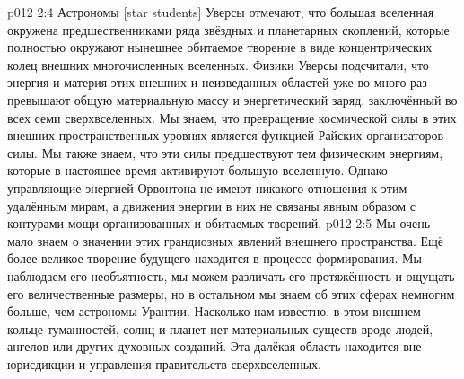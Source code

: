 \vs p012 2:4 \pc Астрономы [star students] Уверсы отмечают, что большая вселенная окружена предшественниками ряда звёздных и планетарных скоплений, которые полностью окружают нынешнее обитаемое творение в виде концентрических колец внешних многочисленных вселенных. Физики Уверсы подсчитали, что энергия и материя этих внешних и неизведанных областей уже во много раз превышают общую материальную массу и энергетический заряд, заключённый во всех семи сверхвселенных. Мы знаем, что превращение космической силы в этих внешних пространственных уровнях является функцией Райских организаторов силы. Мы также знаем, что эти силы предшествуют тем физическим энергиям, которые в настоящее время активируют большую вселенную. Однако управляющие энергией Орвонтона не имеют никакого отношения к этим удалённым мирам, а движения энергии в них не связаны явным образом с контурами мощи организованных и обитаемых творений.
\vs p012 2:5 \pc Мы очень мало знаем о значении этих грандиозных явлений внешнего пространства. Ещё более великое творение будущего находится в процессе формирования. Мы наблюдаем его необъятность, мы можем различать его протяжённость и ощущать его величественные размеры, но в остальном мы знаем об этих сферах немногим больше, чем астрономы Урантии. Насколько нам известно, в этом внешнем кольце туманностей, солнц и планет нет материальных существ вроде людей, ангелов или других духовных созданий. Эта далёкая область находится вне юрисдикции и управления правительств сверхвселенных.
